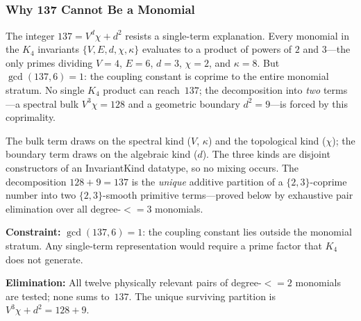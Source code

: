 \documentclass[11pt,a4paper]{book}
\def\leq{<=}%
\def\texttt#1{#1}%
\begin{document}
\begin{code}
\<%
\\
%
\>[2]\AgdaSymbol{;}\AgdaSpace{}%
\AgdaSpace{}%
\AgdaSymbol{=}\AgdaSpace{}%
\<%
\\
%
\>[2]\AgdaSymbol{;}\AgdaSpace{}%
\AgdaSpace{}%
\AgdaSymbol{=}\AgdaSpace{}%
\AgdaSpace{}%
\<%
\\
%
\>[2]\AgdaSymbol{;}\AgdaSpace{}%
\AgdaSpace{}%
\AgdaSymbol{=}\AgdaSpace{}%
\AgdaSpace{}%
\<%
\\
%
\>[2]\AgdaSymbol{\}}\<%
\end{code}

\subsubsection*{Why 137 Cannot Be a Monomial}

The integer $137 = V^d \chi + d^2$ resists a single-term explanation.
Every monomial in the $K_4$ invariants $\{V, E, d, \chi, \kappa\}$
evaluates to a product of powers of $2$ and $3$---the only primes
dividing $V = 4$, $E = 6$, $d = 3$, $\chi = 2$, and
$\kappa = 8$.  But $\gcd(137, 6) = 1$: the coupling constant
is coprime to the entire monomial stratum.  No single $K_4$ product
can reach~$137$; the decomposition into \emph{two} terms---a spectral
bulk $V^3 \chi = 128$ and a geometric boundary $d^2 = 9$---is
forced by this coprimality.

The bulk term draws on the spectral kind ($V$, $\kappa$) and
the topological kind ($\chi$); the boundary term draws on the
algebraic kind ($d$).  The three kinds are disjoint constructors
of an \texttt{InvariantKind} datatype, so no mixing occurs.
The decomposition $128 + 9 = 137$ is the \emph{unique} additive
partition of a $\{2,3\}$-coprime number into two $\{2,3\}$-smooth
primitive terms---proved below by exhaustive pair elimination over
all degree-$\leq 3$ monomials.

\textbf{Constraint:}
$\gcd(137, 6) = 1$: the coupling constant lies outside the monomial
stratum.  Any single-term representation would require a prime
factor that $K_4$ does not generate.

\textbf{Elimination:}
All twelve physically relevant pairs of degree-$\leq 2$ monomials
are tested; none sums to~$137$.  The unique surviving partition is
$V^3 \chi + d^2 = 128 + 9$.
\end{document}
